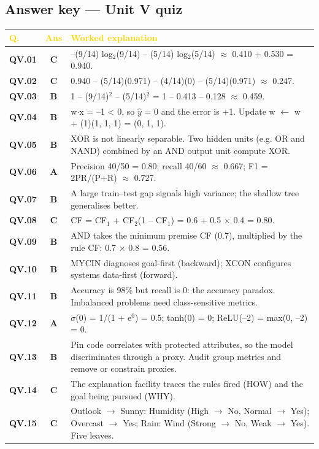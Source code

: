 \subsection*{Answer key --- Unit V quiz}
\begin{longtable}{>{\leavevmode\bfseries\color{navy}}p{1.3cm} c p{13.2cm}}
\rowcolor{navy}\textcolor{gold}{\textbf{Q.}}&\textcolor{gold}{\textbf{Ans}}&\textcolor{gold}{\textbf{Worked explanation}}\\\endhead
QV.01&\textbf{\color{leaf}C}&--(9/14) log$_2$(9/14) -- (5/14) log$_2$(5/14) $\approx$ 0.410 + 0.530 = 0.940.\\
\rowcolor{ivory}QV.02&\textbf{\color{leaf}C}&0.940 -- (5/14)(0.971) -- (4/14)(0) -- (5/14)(0.971) $\approx$ 0.247.\\
QV.03&\textbf{\color{leaf}B}&1 -- (9/14)$^2$ -- (5/14)$^2$ = 1 -- 0.413 -- 0.128 $\approx$ 0.459.\\
\rowcolor{ivory}QV.04&\textbf{\color{leaf}B}&w$\cdot$x = --1 < 0, so $\hat y$ = 0 and the error is +1. Update w $\leftarrow$ w + (1)(1, 1, 1) = (0, 1, 1).\\
QV.05&\textbf{\color{leaf}B}&XOR is not linearly separable. Two hidden units (e.g. OR and NAND) combined by an AND output unit compute XOR.\\
\rowcolor{ivory}QV.06&\textbf{\color{leaf}A}&Precision 40/50 = 0.80; recall 40/60 $\approx$ 0.667; F1 = 2PR/(P+R) $\approx$ 0.727.\\
QV.07&\textbf{\color{leaf}B}&A large train--test gap signals high variance; the shallow tree generalises better.\\
\rowcolor{ivory}QV.08&\textbf{\color{leaf}C}&CF = CF$_1$ + CF$_2$(1 -- CF$_1$) = 0.6 + 0.5 $\times$ 0.4 = 0.80.\\
QV.09&\textbf{\color{leaf}B}&AND takes the minimum premise CF (0.7), multiplied by the rule CF: 0.7 $\times$ 0.8 = 0.56.\\
\rowcolor{ivory}QV.10&\textbf{\color{leaf}B}&MYCIN diagnoses goal-first (backward); XCON configures systems data-first (forward).\\
QV.11&\textbf{\color{leaf}B}&Accuracy is 98\% but recall is 0: the accuracy paradox. Imbalanced problems need class-sensitive metrics.\\
\rowcolor{ivory}QV.12&\textbf{\color{leaf}A}&$\sigma$(0) = 1/(1 + e$^0$) = 0.5; tanh(0) = 0; ReLU(--2) = max(0, --2) = 0.\\
QV.13&\textbf{\color{leaf}B}&Pin code correlates with protected attributes, so the model discriminates through a proxy. Audit group metrics and remove or constrain proxies.\\
\rowcolor{ivory}QV.14&\textbf{\color{leaf}C}&The explanation facility traces the rules fired (HOW) and the goal being pursued (WHY).\\
QV.15&\textbf{\color{leaf}C}&Outlook $\to$ Sunny: Humidity (High $\to$ No, Normal $\to$ Yes); Overcast $\to$ Yes; Rain: Wind (Strong $\to$ No, Weak $\to$ Yes). Five leaves.\\
\end{longtable}